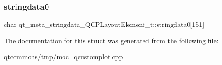 \subsubsection{\texorpdfstring{stringdata0}{stringdata0}}
{\footnotesize\ttfamily char qt\+\_\+meta\+\_\+stringdata\+\_\+\+Q\+C\+P\+Layout\+Element\+\_\+t\+::stringdata0\mbox{[}151\mbox{]}}



The documentation for this struct was generated from the following file\+:\begin{DoxyCompactItemize}
\item 
qtcommons/tmp/\mbox{\hyperlink{moc__qcustomplot_8cpp}{moc\+\_\+qcustomplot.\+cpp}}\end{DoxyCompactItemize}
